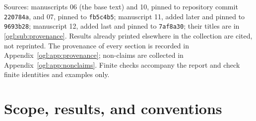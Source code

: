 \documentclass[11pt,oneside]{article}
\numberwithin{equation}{section}
\theoremstyle{definition}
\theoremstyle{remark}
\newcommand{\Oz}{\mathbf{Oz}}
\newcommand{\GOz}{\mathbf{Oz}[i]}
\newcommand{\Q}{\mathbb Q}
\begin{document}
\begin{titlepage}
\begin{minipage}{\textwidth}
\begin{abstract}
\emph{Lattices.} For finite sums of ordinary positive-semidefinite forms with
successively infinitesimal weights we give exact criteria for shortest
nonzero vectors, shortest unimodular vectors and closest points to every
surreal target. When a shortest vector fails to exist the energy values have
no surreal infimum, their lower bounds are an explicit cut, and one monomial
vector improves every set-sized family at once; usual Gauss and LLL reduced
bases then do not exist.

\emph{Chevalley groups and Lie rings.} The result for $n\ge3$ holds for the
elementary and Steinberg groups of every root system without an $A_1$
component, including $G_2$ and the exceptional types; over $\Oz$ and $\GOz$ a
universal set-sized quotient exists exactly when there is no $A_1$ component. A
current Lie ring $\mathfrak l\otimes\Oz$ has one exactly when $\mathfrak l\otimes\Q$
is perfect.

This report merges five independently written manuscripts; it states which
source proved each result, prints shared results once, and keeps every
source's limitations. It is an AI-assisted draft: it has not been refereed,
and nothing in it has been formalized in Lean.
\end{abstract}
\end{minipage}
\vfill
\begin{minipage}{\textwidth}
\footnotesize
Sources: manuscripts 06 (the base text) and 10, pinned to repository commit
\texttt{220784a}, and 07, pinned to \texttt{fb5c4b5}; manuscript 11, added
later and pinned to \texttt{9693b28}; manuscript 12, added last and pinned
to \texttt{7af8a30}; their titles are in
\cref{ogl:sub:provenance}. Results already printed elsewhere in the
collection are cited, not reprinted. The provenance of every section is
recorded in Appendix~\ref{ogl:app:provenance}; non-claims are collected in
Appendix~\ref{ogl:app:nonclaims}. Finite checks accompany the report and check finite
identities and examples only.
\end{minipage}
\end{titlepage}
\hypersetup{pageanchor=true}
\tableofcontents
\newpage
\section{Scope, results, and conventions}\label{ogl:sec:scope}
\end{document}
